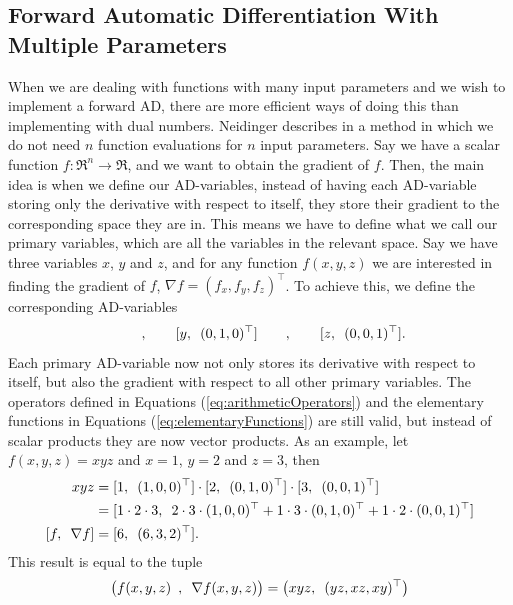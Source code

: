 \subsection{Forward Automatic Differentiation With Multiple Parameters}
When we are dealing with functions with many input parameters and we wish to implement a forward AD, there are more efficient ways of doing this than implementing with dual numbers. Neidinger describes in \emph{\citet{doi:10.1137/080743627}} a method in which we do not need $n$ function evaluations for $n$ input parameters. Say we have a scalar function $f: \Re^n \rightarrow \Re$, and we want to obtain the gradient of $f$. Then, the main idea is when we define our AD-variables, instead of having each AD-variable storing only the derivative with respect to itself, they store their gradient to the corresponding space they are in. This means we have to define what we call our primary variables, which are all the variables in the relevant space. Say we have three variables $x$, $y$ and $z$, and for any function $f(x,y,z)$ we are interested in finding the gradient of $f$, $\nabla f=(f_x, f_y, f_z)^\top$. To achieve this, we define the corresponding AD-variables
\begin{equation*}
    [\adpair{x}{(1,0,0)^\top}]\hspace{2em},\hspace{2em}
    [\adpair{y}{(0,1,0)^\top}]\hspace{2em},\hspace{2em}
    [\adpair{z}{(0,0,1)^\top}].
\end{equation*}
Each primary AD-variable now not only stores its derivative with respect to itself, but also the gradient with respect to all other primary variables. The operators defined in Equations (\ref{eq:arithmeticOperators}) and the elementary functions in Equations (\ref{eq:elementaryFunctions}) are still valid, but instead of scalar products they are now vector products. As an example, let $f(x,y,z) = xyz$ and $x = 1$, $y = 2$ and $z = 3$, then
\begin{align*}
    xyz &= [\adpair{1}{(1,0,0)^\top}]\cdot [\adpair{2}{(0,1,0)^\top}]\cdot
    [\adpair{3}{(0,0,1)^\top}] \\
    &=[\adpair{1\cdot 2\cdot 3}{2\cdot3\cdot(1,0,0)^\top + 1\cdot3\cdot(0,1,0)^\top + 1\cdot2\cdot(0,0,1)^\top}] \\
    [\adpair{f}{\nabla f}] &= [\adpair{6}{(6,3,2)^\top}].
\end{align*}
This result is equal to the tuple
\begin{equation*}
    \big(f(x,y,z) \hspace{0.5em},\hspace{0.5em} \nabla f(x,y,z)\big) = \big(xyz ,\hspace{0.5em} (yz,xz,xy)^\top\big)
\end{equation*}
